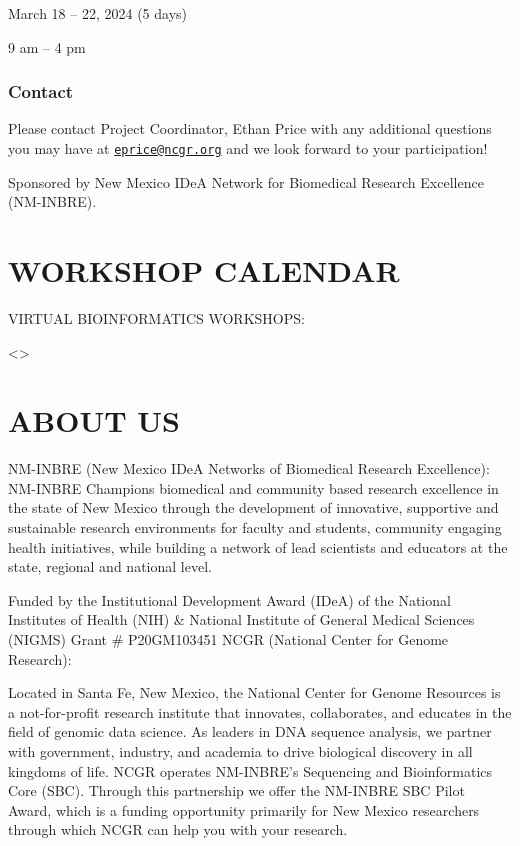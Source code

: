\documentclass[
]{book}
\begin{document}
March 18 -- 22, 2024 (5 days)

9 am -- 4 pm

\hypertarget{contact}{%
\subsection*{Contact}\label{contact}}

Please contact Project Coordinator, Ethan Price with any additional questions you may have at \href{mailto:eprice@ncgr.org}{\nolinkurl{eprice@ncgr.org}} and we look forward to your participation!

Sponsored by New Mexico IDeA Network for Biomedical Research Excellence (NM-INBRE).

\hypertarget{workshop-calendar}{%
\chapter*{WORKSHOP CALENDAR}\label{workshop-calendar}}

VIRTUAL BIOINFORMATICS WORKSHOPS:

\textless{}\textgreater{}

\hypertarget{about-us}{%
\chapter*{ABOUT US}\label{about-us}}

NM-INBRE (New Mexico IDeA Networks of Biomedical Research Excellence):
NM-INBRE Champions biomedical and community based research excellence in the state of New Mexico through the development of innovative, supportive and sustainable research environments for faculty and students, community engaging health initiatives, while building a network of lead scientists and educators at the state, regional and national level.

Funded by the Institutional Development Award (IDeA) of the National Institutes of Health (NIH) \& National Institute of General Medical Sciences (NIGMS) Grant \# P20GM103451
NCGR (National Center for Genome Research):

Located in Santa Fe, New Mexico, the National Center for Genome Resources is a not-for-profit research institute that innovates, collaborates, and educates in the field of genomic data science. As leaders in DNA sequence analysis, we partner with government, industry, and academia to drive biological discovery in all kingdoms of life.
NCGR operates NM-INBRE's Sequencing and Bioinformatics Core (SBC). Through this partnership we offer the NM-INBRE SBC Pilot Award, which is a funding opportunity primarily for New Mexico researchers through which NCGR can help you with your research.
\end{document}
